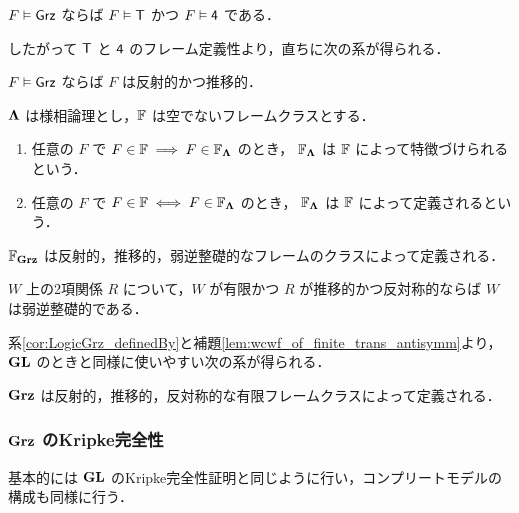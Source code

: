 \documentclass{jsarticle}
\begin{document}
\begin{lemma}
	$F \vDash \mathsf{Grz}$ ならば $F \vDash \mathsf{T}$ かつ $F \vDash \mathsf{4}$ である．
\end{lemma}

したがって $\mathsf{T}$ と $\mathsf{4}$ のフレーム定義性より，直ちに次の系が得られる．

\begin{corollary}
	$F \vDash \mathsf{Grz}$ ならば $F$ は反射的かつ推移的．
\end{corollary}

\begin{definition}
	$\mathbf{\Lambda}$ は様相論理とし，$\mathbb{F}$ は空でないフレームクラスとする．
	\begin{enumerate}
		\item
		      任意の $F$ で $F \in \mathbb{F} \implies F \in \mathbb{F}_{\mathbf{\Lambda}} $ のとき，
		      $\mathbb{F}_{\mathbf{\Lambda}}$ は $\mathbb{F}$ によって特徴づけられるという．
		\item
		      任意の $F$ で $F \in \mathbb{F} \iff F \in \mathbb{F}_{\mathbf{\Lambda}} $ のとき，
		      $\mathbb{F}_{\mathbf{\Lambda}}$ は $\mathbb{F}$ によって定義されるという．
	\end{enumerate}
\end{definition}

\begin{corollary} \label{cor:LogicGrz_definedBy}
	$\mathbb{F}_{\mathbf{Grz}}$ は反射的，推移的，弱逆整礎的なフレームのクラスによって定義される．
\end{corollary}

\begin{lemma}\label{lem:wcwf_of_finite_trans_antisymm}
	$W$ 上の2項関係 $R$ について，$W$ が有限かつ $R$ が推移的かつ反対称的ならば $W$ は弱逆整礎的である．
\end{lemma}

系\ref{cor:LogicGrz_definedBy}と補題\ref{lem:wcwf_of_finite_trans_antisymm}より，$\mathbf{GL}$ のときと同様に使いやすい次の系が得られる．
\begin{corollary}
	$\mathbf{Grz}$ は反射的，推移的，反対称的な有限フレームクラスによって定義される．
\end{corollary}

\subsubsection{$\mathbf{Grz}$ のKripke完全性}

基本的には $\mathbf{GL}$ のKripke完全性証明と同じように行い，コンプリートモデルの構成も同様に行う．
\end{document}
